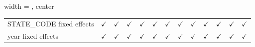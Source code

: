 \begin{table}[htbp]
\begin{adjustbox}{width = \textwidth, center}
\begin{tabular}{lcccccccccccc}
         STATE\_CODE fixed effects                          & $\checkmark$          & $\checkmark$          & $\checkmark$  & $\checkmark$  & $\checkmark$    & $\checkmark$  & $\checkmark$         & $\checkmark$  & $\checkmark$  & $\checkmark$          & $\checkmark$  & $\checkmark$\\   
         year fixed effects                                 & $\checkmark$          & $\checkmark$          & $\checkmark$  & $\checkmark$  & $\checkmark$    & $\checkmark$  & $\checkmark$         & $\checkmark$  & $\checkmark$  & $\checkmark$          & $\checkmark$  & $\checkmark$\\   
         \bottomrule
      \end{tabular}
   \end{adjustbox}
\end{table}


